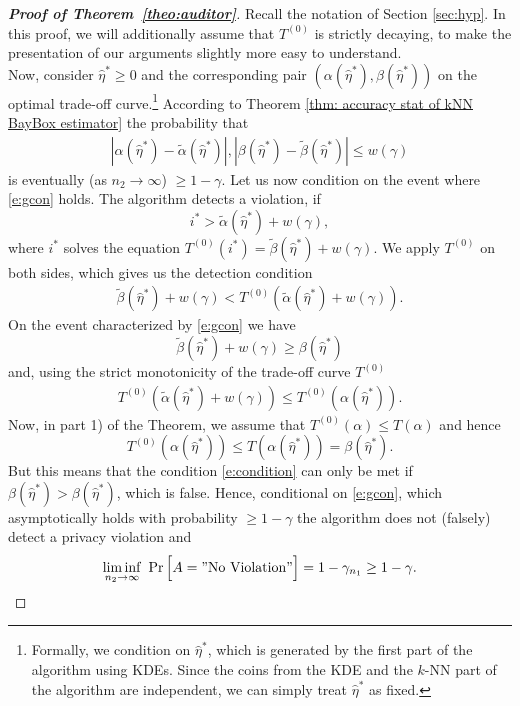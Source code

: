 \begin{proof}[\textbf{Proof of Theorem~\ref{theo:auditor}}] Recall the notation of Section \ref{sec:hyp}. In this proof, we will additionally assume that $T^{(0)}$ is strictly decaying, to make the presentation of our arguments slightly more easy to understand.\\
Now, consider  $\hat \eta^* \ge 0$ and the corresponding pair $(\alpha(\hat \eta^* ), \beta(\hat \eta^*))$ on the optimal trade-off curve.\footnote{Formally, we condition on $\hat \eta^* $, which is generated by the first part of the algorithm using KDEs. Since the coins from the KDE and the $k$-NN part of the algorithm are independent, we can simply treat  $\hat \eta^* $ as fixed.} According to Theorem \ref{thm: accuracy stat of kNN BayBox estimator} the probability that 
\begin{align} \label{e:gcon}
|\alpha(\hat \eta^* ) - \tilde \alpha(\hat \eta^* )|, |\beta(\hat \eta^* )-\tilde \beta(\hat \eta^* )| \le w(\gamma) 
\end{align}
is eventually (as $n_2\to \infty$) $\ge 1- \gamma$. Let us now condition on the event where \eqref{e:gcon} holds. The algorithm detects a violation, if
\[
i^* > \tilde{\alpha}(\hat{\eta}^*) + w(\gamma),
\]
where $i^*$ solves the equation $T^{(0)}(i^*) = \tilde{\beta}(\hat{\eta}^*) + w(\gamma)$.
We apply $T^{(0)}$ on both sides, which gives us the detection condition
\begin{align} \label{e:condition}
\tilde{\beta}(\hat{\eta}^*) + w(\gamma) < T^{(0)}(\tilde{\alpha}(\hat{\eta}^*) + w(\gamma)).
\end{align}
On the event characterized by \eqref{e:gcon} we have
\[
\tilde{\beta}(\hat{\eta}^*) + w(\gamma) \ge \beta(\hat{\eta}^*) 
\]
and, using the strict monotonicity of the trade-off curve $T^{(0)}$ 
\begin{align*}
    T^{(0)}(\tilde{\alpha}(\hat{\eta}^*) + w(\gamma)) \le T^{(0)}(\alpha(\hat{\eta}^*)).
\end{align*}
Now, in part 1) of the Theorem, we assume that $T^{(0)}(\alpha) \le T(\alpha)$ and hence
\[
T^{(0)}(\alpha(\hat{\eta}^*)) \le T(\alpha(\hat{\eta}^*)) = \beta(\hat{\eta}^*).
\]
But this means that the condition \eqref{e:condition} can only be met if $\beta(\hat{\eta}^*)>\beta(\hat{\eta}^*)$, which is false. Hence, conditional on \eqref{e:gcon}, which asymptotically holds with probability $\ge 1-\gamma$ the algorithm does not (falsely) detect a privacy violation and 
\[
\liminf_{n_2 \to \infty} \,\,\Pr\Big[ A = "\textnormal{No Violation}"\Big]=1-\gamma_{n_1}\ge 1-\gamma.
\]
\end{proof}
